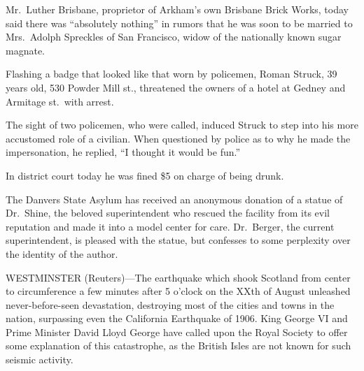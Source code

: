 \documentclass{newspaper1920}
\begin{document}
\begin{multicols}{3}

\noindent
Mr.~Luther Brisbane, proprietor of Arkham's own Brisbane Brick Works,
today said there was ``absolutely nothing'' in rumors that he was soon
to be married to Mrs.~Adolph Spreckles of San Francisco, widow of the
nationally known sugar magnate.

\halfrule


\noindent
Flashing a badge that looked like that worn by policemen, Roman
Struck, 39 years old, 530 Powder Mill st., threatened the owners of a
hotel at Gedney and Armitage st.\ with arrest.

The sight of two policemen, who were called, induced Struck to step
into his more accustomed role of a civilian.  When questioned by
police as to why he made the impersonation, he replied, ``I thought it
would be fun.''

In district court today he was fined \$5 on charge of being drunk.

\halfrule


\noindent
The Danvers State Asylum has received an anonymous donation of a
statue of Dr.~Shine, the beloved superintendent who rescued the
facility from its evil reputation and made it into a model center for
care.  Dr.~Berger, the current superintendent, is pleased with the
statue, but confesses to some perplexity over the identity of the
author.

\columnbreak

\noindent
\begin{minipage}[t][37\baselineskip]{2\columnwidth+1\columnsep}
\fancyrule
\vspace{-16pt}

\begin{multicols}{2}
\noindent
WESTMINSTER (Reuters)---The earthquake which shook Scotland from
center to circumference a few minutes after 5 o'clock on the XXth of
August unleashed never-before-seen devastation, destroying most of the
cities and towns in the nation, surpassing even the California
Earthquake of 1906.  King George VI and Prime Minister David Lloyd
George have called upon the Royal Society to offer some explanation of
this catastrophe, as the British Isles are not known for such seismic
activity.


\end{multicols}
\end{minipage}
\end{multicols}
\end{document}
